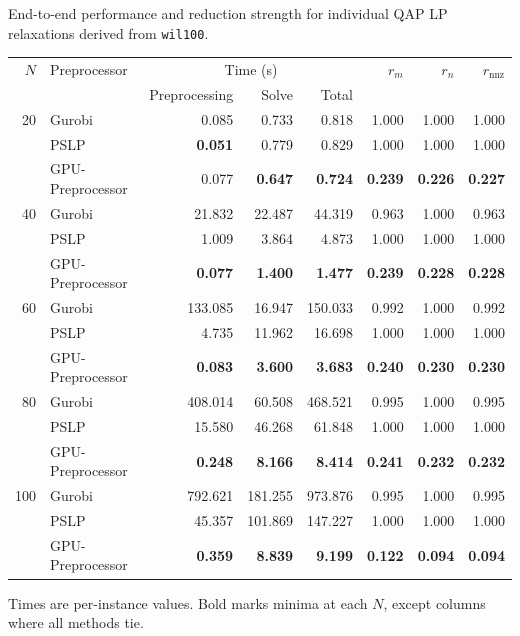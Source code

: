 \begin{table}[H]
\TABLE
{End-to-end performance and reduction strength for
individual QAP LP relaxations derived from \texttt{wil100}.\label{tab:qap-wil100-reduction}}
{\begin{tabularx}{\linewidth}{@{}r>{\raggedright\arraybackslash}Xrrrrrr@{}}
\toprule
\(N\) & Preprocessor & \multicolumn{3}{c}{Time (s)}
& \(r_m\) & \(r_n\) & \(r_{\mathrm{nnz}}\) \\
\cmidrule(lr){3-5}
& & Preprocessing & Solve & Total & & & \\
\midrule
20 & Gurobi
& 0.085 & 0.733 & 0.818 & 1.000 & 1.000 & 1.000 \\
& PSLP
& \textbf{0.051} & 0.779 & 0.829 & 1.000 & 1.000 & 1.000 \\
& GPU-Preprocessor
& 0.077 & \textbf{0.647} & \textbf{0.724}
& \textbf{0.239} & \textbf{0.226} & \textbf{0.227} \\
\midrule
40 & Gurobi
& 21.832 & 22.487 & 44.319 & 0.963 & 1.000 & 0.963 \\
& PSLP
& 1.009 & 3.864 & 4.873 & 1.000 & 1.000 & 1.000 \\
& GPU-Preprocessor
& \textbf{0.077} & \textbf{1.400} & \textbf{1.477}
& \textbf{0.239} & \textbf{0.228} & \textbf{0.228} \\
\midrule
60 & Gurobi
& 133.085 & 16.947 & 150.033 & 0.992 & 1.000 & 0.992 \\
& PSLP
& 4.735 & 11.962 & 16.698 & 1.000 & 1.000 & 1.000 \\
& GPU-Preprocessor
& \textbf{0.083} & \textbf{3.600} & \textbf{3.683}
& \textbf{0.240} & \textbf{0.230} & \textbf{0.230} \\
\midrule
80 & Gurobi
& 408.014 & 60.508 & 468.521 & 0.995 & 1.000 & 0.995 \\
& PSLP
& 15.580 & 46.268 & 61.848 & 1.000 & 1.000 & 1.000 \\
& GPU-Preprocessor
& \textbf{0.248} & \textbf{8.166} & \textbf{8.414}
& \textbf{0.241} & \textbf{0.232} & \textbf{0.232} \\
\midrule
100 & Gurobi
& 792.621 & 181.255 & 973.876 & 0.995 & 1.000 & 0.995 \\
& PSLP
& 45.357 & 101.869 & 147.227 & 1.000 & 1.000 & 1.000 \\
& GPU-Preprocessor
& \textbf{0.359} & \textbf{8.839} & \textbf{9.199}
& \textbf{0.122} & \textbf{0.094} & \textbf{0.094} \\
\bottomrule
\end{tabularx}}
{Times are per-instance values. Bold marks minima at each \(N\),
except columns where all methods tie.}
\end{table}
